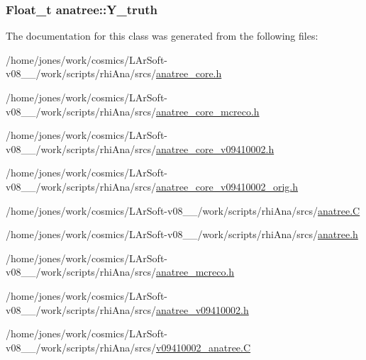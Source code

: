 \hypertarget{classanatree_af7eb0221e94b46b77a90aedf51889a33}{
\subsubsection[{Y\-\_\-truth}]{\setlength{\rightskip}{0pt plus 5cm}Float\-\_\-t anatree\-::\-Y\-\_\-truth}}\label{classanatree_af7eb0221e94b46b77a90aedf51889a33}


The documentation for this class was generated from the following files\-:\begin{DoxyCompactItemize}
\item 
/home/jones/work/cosmics/\-L\-Ar\-Soft-\/v08\-\_\-\_/work/scripts/rhi\-Ana/srcs/\hyperlink{anatree__core_8h}{anatree\-\_\-core.\-h}\item 
/home/jones/work/cosmics/\-L\-Ar\-Soft-\/v08\-\_\-\_/work/scripts/rhi\-Ana/srcs/\hyperlink{anatree__core__mcreco_8h}{anatree\-\_\-core\-\_\-mcreco.\-h}\item 
/home/jones/work/cosmics/\-L\-Ar\-Soft-\/v08\-\_\-\_/work/scripts/rhi\-Ana/srcs/\hyperlink{anatree__core__v09410002_8h}{anatree\-\_\-core\-\_\-v09410002.\-h}\item 
/home/jones/work/cosmics/\-L\-Ar\-Soft-\/v08\-\_\-\_/work/scripts/rhi\-Ana/srcs/\hyperlink{anatree__core__v09410002__orig_8h}{anatree\-\_\-core\-\_\-v09410002\-\_\-orig.\-h}\item 
/home/jones/work/cosmics/\-L\-Ar\-Soft-\/v08\-\_\-\_/work/scripts/rhi\-Ana/srcs/\hyperlink{anatree_8C}{anatree.\-C}\item 
/home/jones/work/cosmics/\-L\-Ar\-Soft-\/v08\-\_\-\_/work/scripts/rhi\-Ana/srcs/\hyperlink{anatree_8h}{anatree.\-h}\item 
/home/jones/work/cosmics/\-L\-Ar\-Soft-\/v08\-\_\-\_/work/scripts/rhi\-Ana/srcs/\hyperlink{anatree__mcreco_8h}{anatree\-\_\-mcreco.\-h}\item 
/home/jones/work/cosmics/\-L\-Ar\-Soft-\/v08\-\_\-\_/work/scripts/rhi\-Ana/srcs/\hyperlink{anatree__v09410002_8h}{anatree\-\_\-v09410002.\-h}\item 
/home/jones/work/cosmics/\-L\-Ar\-Soft-\/v08\-\_\-\_/work/scripts/rhi\-Ana/srcs/\hyperlink{v09410002__anatree_8C}{v09410002\-\_\-anatree.\-C}\end{DoxyCompactItemize}
